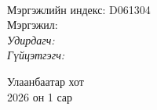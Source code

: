 \begin{titlepage}
\begin{center}

{\scshape\LARGE \univname\par} %
{\scshape\Large \facname\par}\vspace{0.5cm} %

\vspace{2cm}
\hfill \large{\deptname} \\

\vspace{2cm}

{\huge \bfseries \ttitle\par}\vspace{0.4cm} %

\vspace{2cm}

\begin{minipage}[t] {0.9\textwidth}
\begin{flushleft} 
\normalsize

Мэргэжлийн индекс: D061304 \\ 
Мэргэжил: \degreename \\[2cm]

\emph{Удирдагч:} {\supname} \\%
\emph{Гүйцэтгэгч:} {\shortname} \\ %

\end{flushleft}
\end{minipage}

\vfill

\large {Улаанбаатар хот} \\
{\large 2026 он 1 сар}\\ %

\end{center}
\end{titlepage}

 